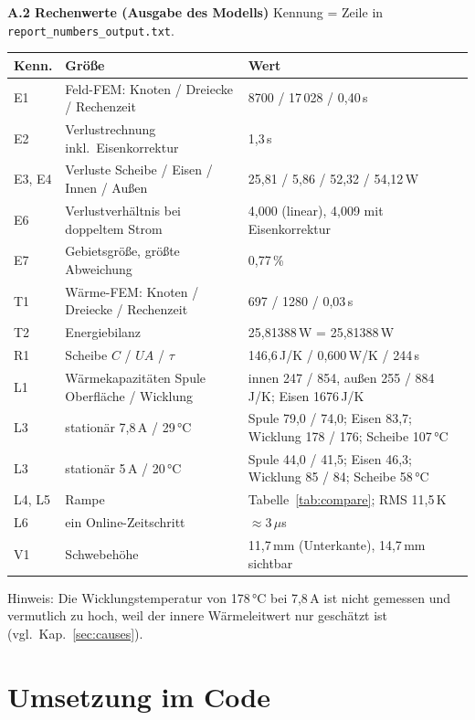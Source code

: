 \documentclass[a4paper, 10pt, conference]{ieeeconf}
\newcommand{\anh}[1]{\par\medskip\noindent\textbf{#1}\quad}
\begin{document}
\anh{A.2 Rechenwerte (Ausgabe des Modells)} Kennung = Zeile in
\texttt{report\_numbers\_output.txt}.

\begin{table}[!ht]
\centering\footnotesize
\begin{tabularx}{\columnwidth}{@{}lYY@{}}
\toprule
Kenn. & Größe & Wert \\
\midrule
E1 & Feld-FEM: Knoten / Dreiecke / Rechenzeit & 8700 / 17\,028 / 0,40\,s \\
E2 & Verlustrechnung inkl.\ Eisenkorrektur & 1,3\,s \\
E3, E4 & Verluste Scheibe / Eisen / Innen / Außen & 25,81 / 5,86 / 52,32 / 54,12\,W \\
E6 & Verlustverhältnis bei doppeltem Strom & 4,000 (linear), 4,009 mit Eisenkorrektur \\
E7 & Gebietsgröße, größte Abweichung & 0,77\,\% \\
T1 & Wärme-FEM: Knoten / Dreiecke / Rechenzeit & 697 / 1280 / 0,03\,s \\
T2 & Energiebilanz & 25,81388\,W = 25,81388\,W \\
R1 & Scheibe $C$ / $UA$ / $\tau$ & 146,6\,J/K / 0,600\,W/K / 244\,s \\
L1 & Wärmekapazitäten Spule Oberfläche / Wicklung & innen 247 / 854, außen 255 / 884\,J/K; Eisen 1676\,J/K \\
L3 & stationär 7,8\,A / 29\,°C & Spule 79,0 / 74,0; Eisen 83,7; Wicklung 178 / 176; Scheibe 107\,°C \\
L3 & stationär 5\,A / 20\,°C & Spule 44,0 / 41,5; Eisen 46,3; Wicklung 85 / 84; Scheibe 58\,°C \\
L4, L5 & Rampe & Tabelle~\ref{tab:compare}; RMS 11,5\,K \\
L6 & ein Online-Zeitschritt & $\approx 3\,\mu$s \\
V1 & Schwebehöhe & 11,7\,mm (Unterkante), 14,7\,mm sichtbar \\
\bottomrule
\end{tabularx}
\end{table}

\noindent Hinweis: Die Wicklungstemperatur von 178\,°C bei 7,8\,A ist nicht
gemessen und vermutlich zu hoch, weil der innere Wärmeleitwert nur geschätzt
ist (vgl.\ Kap.~\ref{sec:causes}).

\section{Umsetzung im Code}
\label{app:code}
\end{document}
